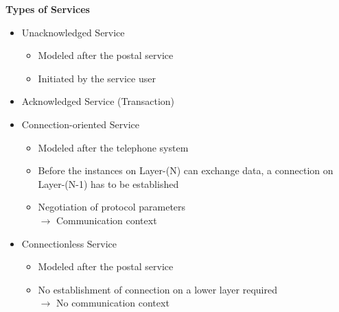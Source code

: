 \documentclass[11pt,ngerman]{article}
\begin{document}
\textbf{Types of Services}
\begin{itemize}[noitemsep]
\item Unacknowledged	Service
\begin{itemize}[noitemsep]
\item Modeled	after	the	postal	service
\item Initiated	by	the	service	user
\end{itemize}
\item Acknowledged	Service (Transaction)
\item Connection-oriented	Service
\begin{itemize}[noitemsep]
\item Modeled	after	the	telephone	system
\item Before	the	instances	on	Layer-(N)	can	
exchange	data,	a	connection	on	
Layer-(N-1)	has	to	be	established
\item Negotiation	of	protocol	parameters\\
$\rightarrow$ Communication	context
\end{itemize}
\item Connectionless	Service
\begin{itemize}[noitemsep]
\item  Modeled	after	the	postal	service
\item No	establishment	of	connection	on	a	
lower	layer	required\\
$\rightarrow$ No	communication	context
\end{itemize}
\end{itemize}
\end{document}
